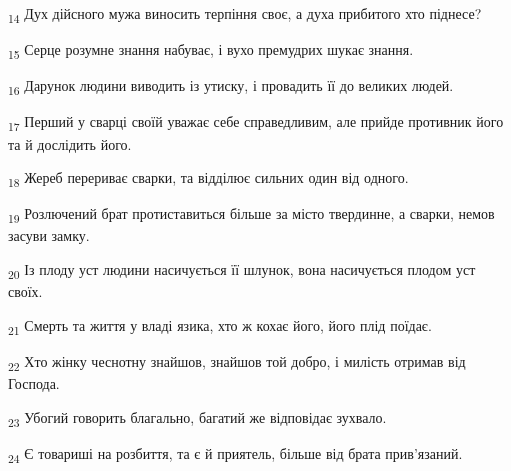 \begin{tcolorbox}
\textsubscript{14} Дух дійсного мужа виносить терпіння своє, а духа прибитого хто піднесе?
\end{tcolorbox}
\begin{tcolorbox}
\textsubscript{15} Серце розумне знання набуває, і вухо премудрих шукає знання.
\end{tcolorbox}
\begin{tcolorbox}
\textsubscript{16} Дарунок людини виводить із утиску, і провадить її до великих людей.
\end{tcolorbox}
\begin{tcolorbox}
\textsubscript{17} Перший у сварці своїй уважає себе справедливим, але прийде противник його та й дослідить його.
\end{tcolorbox}
\begin{tcolorbox}
\textsubscript{18} Жереб перериває сварки, та відділює сильних один від одного.
\end{tcolorbox}
\begin{tcolorbox}
\textsubscript{19} Розлючений брат протиставиться більше за місто твердинне, а сварки, немов засуви замку.
\end{tcolorbox}
\begin{tcolorbox}
\textsubscript{20} Із плоду уст людини насичується її шлунок, вона насичується плодом уст своїх.
\end{tcolorbox}
\begin{tcolorbox}
\textsubscript{21} Смерть та життя у владі язика, хто ж кохає його, його плід поїдає.
\end{tcolorbox}
\begin{tcolorbox}
\textsubscript{22} Хто жінку чеснотну знайшов, знайшов той добро, і милість отримав від Господа.
\end{tcolorbox}
\begin{tcolorbox}
\textsubscript{23} Убогий говорить благально, багатий же відповідає зухвало.
\end{tcolorbox}
\begin{tcolorbox}
\textsubscript{24} Є товариші на розбиття, та є й приятель, більше від брата прив'язаний.
\end{tcolorbox}
